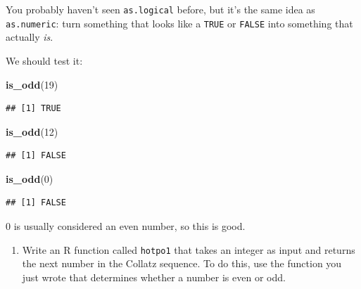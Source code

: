 \documentclass[]{tufte-book}
\newenvironment{Shaded}{}{}
\newcommand{\ControlFlowTok}[1]{\textcolor[rgb]{0.00,0.44,0.13}{\textbf{#1}}}
\newcommand{\DecValTok}[1]{\textcolor[rgb]{0.25,0.63,0.44}{#1}}
\newcommand{\KeywordTok}[1]{\textcolor[rgb]{0.00,0.44,0.13}{\textbf{#1}}}
\newcommand{\NormalTok}[1]{#1}
\newcommand{\OperatorTok}[1]{\textcolor[rgb]{0.40,0.40,0.40}{#1}}
\newcommand{\StringTok}[1]{\textcolor[rgb]{0.25,0.44,0.63}{#1}}
\providecommand{\tightlist}{%
  \setlength{\itemsep}{0pt}\setlength{\parskip}{0pt}}
\theoremstyle{definition}
\theoremstyle{definition}
\theoremstyle{definition}
\theoremstyle{remark}
\begin{document}
\begin{Shaded}
\end{Shaded}

You probably haven't seen \texttt{as.logical} before, but it's the same
idea as \texttt{as.numeric}: turn something that looks like a
\texttt{TRUE} or \texttt{FALSE} into something that actually \emph{is}.

We should test it:

\begin{Shaded}
\begin{Highlighting}[]
\KeywordTok{is_odd}\NormalTok{(}\DecValTok{19}\NormalTok{)}
\end{Highlighting}
\end{Shaded}

\begin{verbatim}
## [1] TRUE
\end{verbatim}

\begin{Shaded}
\begin{Highlighting}[]
\KeywordTok{is_odd}\NormalTok{(}\DecValTok{12}\NormalTok{)}
\end{Highlighting}
\end{Shaded}

\begin{verbatim}
## [1] FALSE
\end{verbatim}

\begin{Shaded}
\begin{Highlighting}[]
\KeywordTok{is_odd}\NormalTok{(}\DecValTok{0}\NormalTok{)}
\end{Highlighting}
\end{Shaded}

\begin{verbatim}
## [1] FALSE
\end{verbatim}

0 is usually considered an even number, so this is good.

\begin{enumerate}
\def\labelenumi{(\alph{enumi})}
\setcounter{enumi}{2}
\tightlist
\item
  Write an R function called \texttt{hotpo1}
   that takes
  an integer as input and returns the next number in the Collatz
  sequence. To do this, use the function you just wrote that determines
  whether a number is even or odd.
\end{enumerate}
\end{document}
